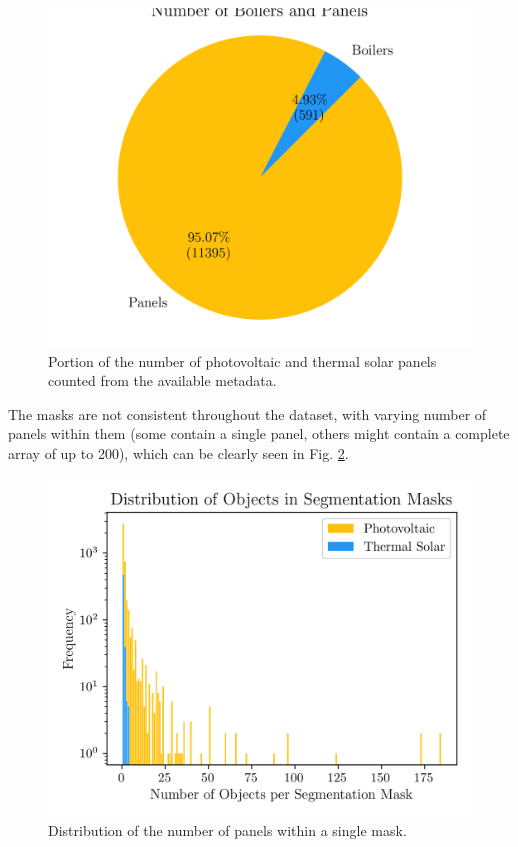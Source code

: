 \documentclass[conference]{IEEEtran}
\begin{document}
\begin{figure}[H]
    \centering
    \includegraphics[width=1\linewidth]{assets/data_distribution.png}
    \caption{Portion of the number of photovoltaic and thermal solar panels counted from the available metadata.}
    \label{fig:data_distribution}
\end{figure}


The masks are not consistent throughout the dataset, with varying number of panels within them (some contain a single panel, others might contain a complete array of up to 200), which can be clearly seen in Fig. \ref{fig:data_objectdistribution}.

\begin{figure}[H]
    \centering
    \includegraphics[width=1\linewidth]{assets/data_objectdistribution.png}
    \caption{Distribution of the number of panels within a single mask.}
    \label{fig:data_objectdistribution}
\end{figure}
\end{document}
